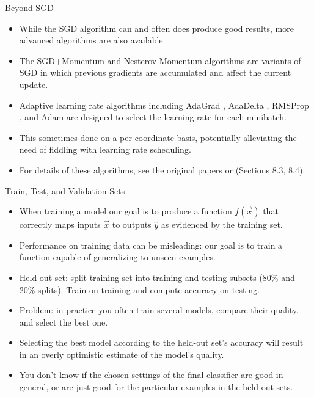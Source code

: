\documentclass[handout]{beamer}
\begin{document}
\begin{frame}{Beyond SGD}
\begin{scriptsize}
\begin{itemize}

 \item While the SGD algorithm can and often does produce good results, more advanced algorithms are also available. 
 \item The SGD+Momentum \cite{polyak1964some} and Nesterov Momentum \cite{nesterov2018lectures,sutskever2013importance}  algorithms are variants of SGD in which previous gradients are accumulated and affect the current update. 
\item Adaptive learning rate algorithms including AdaGrad \cite{duchi2011adaptive}, AdaDelta \cite{zeiler2012adadelta}, RMSProp \cite{tieleman2012lecture}, and Adam \cite{kingma2014adam} are designed to select the learning rate for each minibatch.
\item This sometimes done on a per-coordinate basis, potentially alleviating the need of fiddling with learning rate scheduling. 
\item For details of these algorithms, see the original papers or \cite{goodfellow2016deep}(Sections 8.3, 8.4).
 
\end{itemize}
\end{scriptsize}

\end{frame}




\begin{frame}{Train, Test, and Validation Sets}
\begin{scriptsize}
\begin{itemize}
\item When training a model our goal is to produce a function $f(\vec{x})$ that correctly maps inputs $\vec{x}$ to outputs $\hat{y}$ as evidenced by the training set.
\item Performance on training data can be misleading: our goal is to train a function capable of generalizing to unseen examples.  
\item Held-out set: split training set into training and testing subsets (80\% and 20\% splits). Train on training and compute accuracy on testing.
\item Problem: in practice you often train several models, compare their quality, and select the best one. 
\item Selecting the best model according to the held-out set's accuracy will result in an overly optimistic estimate of the model's quality.
\item You don't know if the chosen settings of the final classifier are good in general, or are just good for the particular examples in the held-out sets.

\end{itemize}
\end{scriptsize}
\end{frame}
\end{document}
